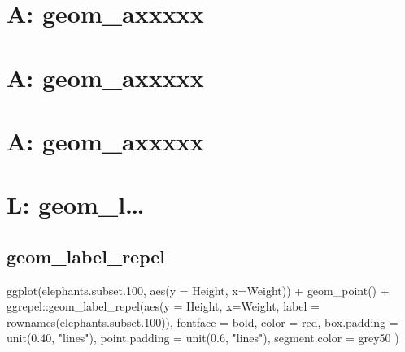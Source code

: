 \documentclass[
]{book}
\newenvironment{Shaded}{\begin{snugshade}}{\end{snugshade}}
\newcommand{\AttributeTok}[1]{\textcolor[rgb]{0.77,0.63,0.00}{#1}}
\newcommand{\FloatTok}[1]{\textcolor[rgb]{0.00,0.00,0.81}{#1}}
\newcommand{\FunctionTok}[1]{\textcolor[rgb]{0.00,0.00,0.00}{#1}}
\newcommand{\NormalTok}[1]{#1}
\newcommand{\SpecialCharTok}[1]{\textcolor[rgb]{0.00,0.00,0.00}{#1}}
\newcommand{\StringTok}[1]{\textcolor[rgb]{0.31,0.60,0.02}{#1}}
\begin{document}
\hypertarget{a-geom_axxxxx-1}{%
\chapter{A: geom\_axxxxx}\label{a-geom_axxxxx-1}}

\hypertarget{a-geom_axxxxx-2}{%
\chapter{A: geom\_axxxxx}\label{a-geom_axxxxx-2}}

\hypertarget{a-geom_axxxxx-3}{%
\chapter{A: geom\_axxxxx}\label{a-geom_axxxxx-3}}

\hypertarget{l-geom_l}{%
\chapter{L: geom\_l\ldots{}}\label{l-geom_l}}

\hypertarget{geom_label_repel}{%
\section{geom\_label\_repel}\label{geom_label_repel}}

\begin{Shaded}
\begin{Highlighting}[]
\FunctionTok{ggplot}\NormalTok{(elephants.subset}\FloatTok{.100}\NormalTok{, }\FunctionTok{aes}\NormalTok{(}\AttributeTok{y =}\NormalTok{ Height, }\AttributeTok{x=}\NormalTok{Weight)) }\SpecialCharTok{+}
  \FunctionTok{geom\_point}\NormalTok{() }\SpecialCharTok{+}
\NormalTok{  ggrepel}\SpecialCharTok{::}\FunctionTok{geom\_label\_repel}\NormalTok{(}\FunctionTok{aes}\NormalTok{(}\AttributeTok{y =}\NormalTok{ Height, }\AttributeTok{x=}\NormalTok{Weight, }
                                \AttributeTok{label =} \FunctionTok{rownames}\NormalTok{(elephants.subset}\FloatTok{.100}\NormalTok{)),}
                                \AttributeTok{fontface =} \StringTok{\textquotesingle{}bold\textquotesingle{}}\NormalTok{, }\AttributeTok{color =} \StringTok{\textquotesingle{}red\textquotesingle{}}\NormalTok{,}
                                \AttributeTok{box.padding =} \FunctionTok{unit}\NormalTok{(}\FloatTok{0.40}\NormalTok{, }\StringTok{"lines"}\NormalTok{),}
                                \AttributeTok{point.padding =} \FunctionTok{unit}\NormalTok{(}\FloatTok{0.6}\NormalTok{, }\StringTok{"lines"}\NormalTok{),}
                                \AttributeTok{segment.color =} \StringTok{\textquotesingle{}grey50\textquotesingle{}}
\NormalTok{  )}
\end{Highlighting}
\end{Shaded}
\end{document}
